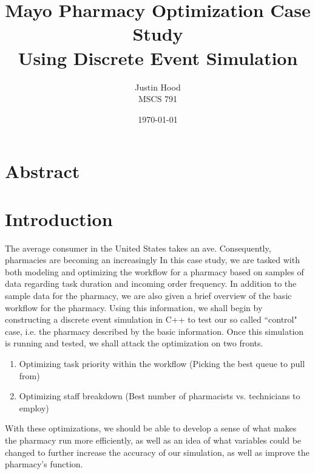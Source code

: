 \documentclass[10pt]{report}            %
\title{\bf Mayo Pharmacy Optimization Case Study\\
\large Using Discrete Event Simulation}  %
\author{Justin Hood\\
MSCS 791}              %
\date{\today}                           %
\begin{document}
\maketitle                              %
\setcounter{page}{2}                    %
\newpage
\section*{Abstract}
\section*{Introduction}                %
The average consumer in the United States takes an ave. Consequently, pharmacies are becoming an increasingly 
In this case study, we are tasked with both modeling and optimizing the workflow for a pharmacy based on samples of data regarding task duration and incoming order frequency. In addition to the sample data for the pharmacy, we are also given a brief overview of the basic workflow for the pharmacy. Using this information, we shall begin by constructing a discrete event simulation in C++ to test our so called ``control" case, i.e. the pharmacy described by the basic information. Once this simulation is running and tested, we shall attack the optimization on two fronts.
\begin{enumerate}
\item Optimizing task priority within the workflow (Picking the best queue to pull from)
\item Optimizing staff breakdown (Best number of pharmacists vs. technicians to employ)
\end{enumerate}
With these optimizations, we should be able to develop a sense of what makes the pharmacy run more efficiently, as well as an idea of what variables could be changed to further increase the accuracy of our simulation, as well as improve the pharmacy's function.
\end{document}

